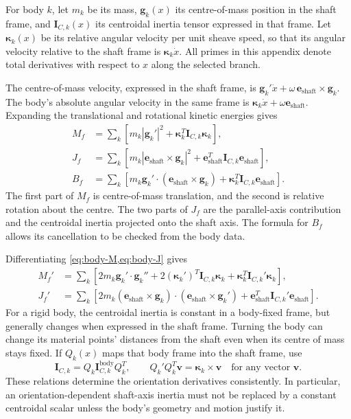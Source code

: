 \documentclass[11pt,letterpaper]{article}
\numberwithin{equation}{section}
\newcommand{\e}{\bm e_{\mathrm{shaft}}}
\begin{document}
For body $k$, let $m_k$ be its mass, $\bm g_k(x)$ its centre-of-mass position in the shaft frame, and $\bm I_{C,k}(x)$ its centroidal inertia tensor expressed in that frame. Let $\bm\kappa_k(x)$ be its relative angular velocity per unit sheave speed, so that its angular velocity relative to the shaft frame is $\bm\kappa_k\dot x$. All primes in this appendix denote total derivatives with respect to $x$ along the selected branch.

The centre-of-mass velocity, expressed in the shaft frame, is
$\bm g_k'\dot x+\omega\,\e\times\bm g_k$.
The body's absolute angular velocity in the same frame is
$\bm\kappa_k\dot x+\omega\e$.
Expanding the translational and rotational kinetic energies gives
\begin{align}
  M_f&=\sum_k\left[m_k|\bm g_k'|^2
                  +\bm\kappa_k^{T}\bm I_{C,k}\bm\kappa_k\right],
                  \label{eq:body-M}\\
  J_f&=\sum_k\left[m_k|\e\times\bm g_k|^2
                         +\e^{T}\bm I_{C,k}\e\right],
                         \label{eq:body-J}\\
  B_f&=\sum_k\left[m_k\bm g_k'\cdot(\e\times\bm g_k)
                         +\bm\kappa_k^{T}\bm I_{C,k}\e\right].
                         \label{eq:body-B}
\end{align}
The first part of $M_f$ is centre-of-mass translation, and the second is relative rotation about the centre. The two parts of $J_f$ are the parallel-axis contribution and the centroidal inertia projected onto the shaft axis. The formula for $B_f$ allows its cancellation to be checked from the body data.

Differentiating \cref{eq:body-M,eq:body-J} gives
\begin{align}
  M_f'&=\sum_k\left[2m_k\bm g_k'\cdot\bm g_k''
      +2(\bm\kappa_k')^T\bm I_{C,k}\bm\kappa_k
      +\bm\kappa_k^T\bm I_{C,k}'\bm\kappa_k\right],
      \label{eq:body-Mprime}\\
  J_f'&=\sum_k\left[2m_k(\e\times\bm g_k)\cdot
                           (\e\times\bm g_k')
                    +\e^T\bm I_{C,k}'\e\right].
                    \label{eq:body-Jprime}
\end{align}
For a rigid body, the centroidal inertia is constant in a body-fixed frame, but generally changes when expressed in the shaft frame. Turning the body can change its material points' distances from the shaft even when its centre of mass stays fixed. If $Q_k(x)$ maps that body frame into the shaft frame, use
\begin{equation}
  \bm I_{C,k}=Q_k\bm I_{C,k}^{\mathrm{body}}Q_k^T,
  \qquad
  Q_k'Q_k^T\bm v=\bm\kappa_k\times\bm v
  \quad\text{for any vector }\bm v.
\end{equation}
These relations determine the orientation derivatives consistently. In particular, an orientation-dependent shaft-axis inertia must not be replaced by a constant centroidal scalar unless the body's geometry and motion justify it.
\end{document}
